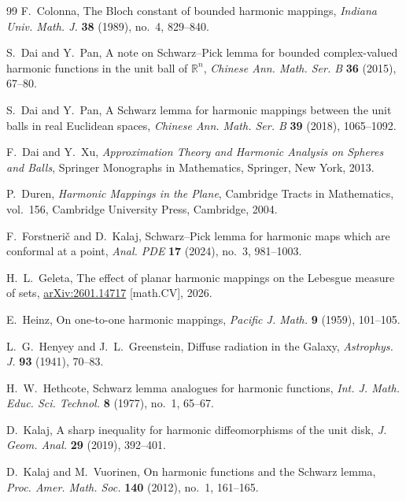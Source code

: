 \documentclass[11pt,reqno]{amsart}
\theoremstyle{remark}
\begin{document}
\begin{thebibliography}{99}
F.~Colonna,
\newblock The Bloch constant of bounded harmonic mappings,
\newblock \emph{Indiana Univ. Math. J.} \textbf{38} (1989), no.~4, 829--840.

S.~Dai and Y.~Pan,
\newblock A note on Schwarz--Pick lemma for bounded complex-valued harmonic
functions in the unit ball of $\mathbb R^n$,
\newblock \emph{Chinese Ann. Math. Ser. B} \textbf{36} (2015), 67--80.

S.~Dai and Y.~Pan,
\newblock A Schwarz lemma for harmonic mappings between the unit balls in
real Euclidean spaces,
\newblock \emph{Chinese Ann. Math. Ser. B} \textbf{39} (2018), 1065--1092.

F.~Dai and Y.~Xu,
\newblock \emph{Approximation Theory and Harmonic Analysis on Spheres and Balls},
\newblock Springer Monographs in Mathematics,
Springer, New York, 2013.

P.~Duren,
\newblock \emph{Harmonic Mappings in the Plane},
\newblock Cambridge Tracts in Mathematics, vol.~156,
Cambridge University Press, Cambridge, 2004.

F.~Forstneri\v{c} and D.~Kalaj,
\newblock Schwarz--Pick lemma for harmonic maps which are conformal at a point,
\newblock \emph{Anal. PDE} \textbf{17} (2024), no.~3, 981--1003.

H.~L.~Geleta,
\newblock The effect of planar harmonic mappings on the Lebesgue measure of sets,
\newblock \href{https://arxiv.org/abs/2601.14717}{arXiv:2601.14717} [math.CV], 2026.

E.~Heinz,
\newblock On one-to-one harmonic mappings,
\newblock \emph{Pacific J. Math.} \textbf{9} (1959), 101--105.

L.~G.~Henyey and J.~L.~Greenstein,
\newblock Diffuse radiation in the Galaxy,
\newblock \emph{Astrophys. J.} \textbf{93} (1941), 70--83.

H.~W.~Hethcote,
\newblock Schwarz lemma analogues for harmonic functions,
\newblock \emph{Int. J. Math. Educ. Sci. Technol.}
\textbf{8} (1977), no.~1, 65--67.

D.~Kalaj,
\newblock A sharp inequality for harmonic diffeomorphisms of the unit disk,
\newblock \emph{J. Geom. Anal.} \textbf{29} (2019), 392--401.

D.~Kalaj and M.~Vuorinen,
\newblock On harmonic functions and the Schwarz lemma,
\newblock \emph{Proc. Amer. Math. Soc.}
\textbf{140} (2012), no.~1, 161--165.


\end{thebibliography}
\end{document}
